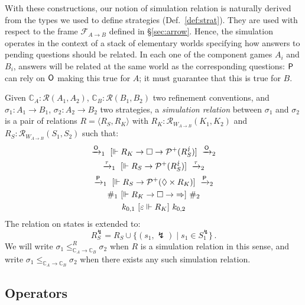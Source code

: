 With these constructions,
our notion of simulation relation
is naturally derived from
the types we used to define strategies (Def.~\ref{def:strat}).
They are used
with respect to the frame $\mathcal{F}_{A \rightarrow B}$
defined in \S\ref{sec:arrow}.
Hence, the simulation operates in the context of
a stack of elementary worlds
specifying how answers to pending questions
should be related.
In each one of the component games $A_i$ and $B_i$,
answers will be related at the same world as the corresponding questions:
$ \mathsf{P} $ can rely on $ \mathsf{O} $ making this true for $A$;
it must guarantee that this is true for $B$.

\begin{definition} %
Given
$\mathbb{C}_A : \mathcal{R}(A_1, A_2)$,
$\mathbb{C}_B : \mathcal{R}(B_1, B_2)$
two refinement conventions, and
$\sigma_1 : A_1 \rightarrow B_1$,
$\sigma_2 : A_2 \rightarrow B_2$
two strategies,
a \emph{simulation relation} between $\sigma_1$ and $\sigma_2$
is a pair of relations $R = \langle R_S, R_K \rangle$ with
$R_K : \mathcal{R}_{W_{\!A \rightarrow B}}(K_1, K_2)$ and
$R_S : \mathcal{R}_{W_{\!A \rightarrow B}}(S_1, S_2)$
such that:
\begin{gather*}
  \xrightarrow{ \mathsf{O} }_1
  \ [{\Vdash R_K \rightarrow \Box \rightarrow \mathcal{P}^+(R_S^\lightning)}]\ 
  \xrightarrow{ \mathsf{O} }_2
  \\
  \xrightarrow{\tau}_1
  \ [{\Vdash R_S \rightarrow \mathcal{P}^+(R_S^\lightning)}]\ 
  \xrightarrow{\tau}_2
  \\
  \xrightarrow{ \mathsf{P} }_1
  \ [{\Vdash R_S \rightarrow \mathcal{P}^+(\Diamond \times R_K)}]\ 
  \xrightarrow{ \mathsf{P} }_2
  \\
  \#_1
  \ [{\Vdash R_K \rightarrow \Box \rightarrow {\Rightarrow}}]\ 
  \#_2
  \\
  k_{0,1} \ [{\varepsilon \Vdash R_K}]\  k_{0,2}
\end{gather*}
The relation on states is extended to:
\[
    R_S^\lightning =
    R_S \cup \{ (s_1, \lightning) \mid s_1 \in S_1^\lightning \} \,.
\]
We will write
$\sigma_1 \le_{\mathbb{C}_A \rightarrow \mathbb{C}_B}^R \sigma_2$
when $R$ is a simulation relation in this sense, and write
$\sigma_1 \le_{\mathbb{C}_A \rightarrow \mathbb{C}_B} \sigma_2$
when there exists any such simulation relation.
\end{definition}


\subsection{Operators} %

